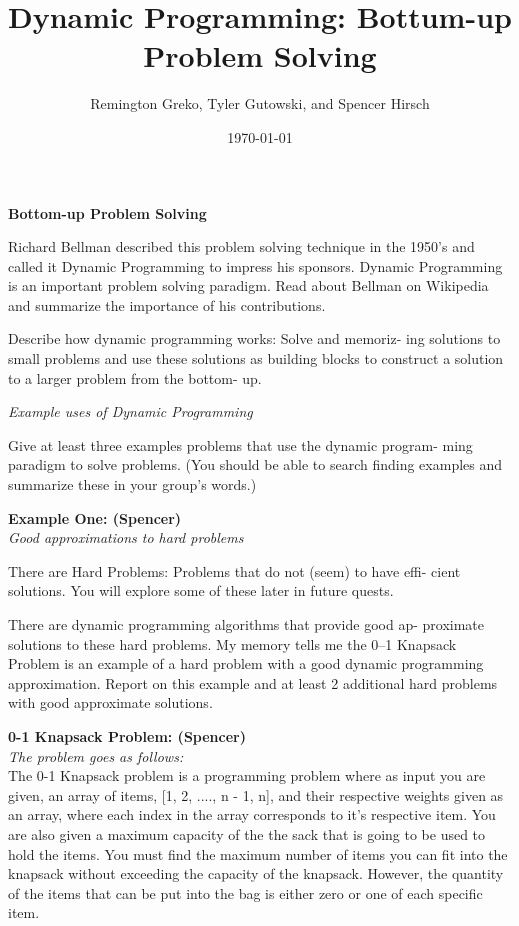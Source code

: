 \documentclass{article}
\begin{document}
\title{\textbf{Dynamic Programming: Bottum-up Problem Solving}}
\author{Remington Greko, Tyler Gutowski, and Spencer Hirsch}
\date{\today}

\maketitle

\noindent \textbf{Bottom-up Problem Solving} 


Richard Bellman described this problem solving technique in the
1950’s and called it Dynamic Programming to impress his sponsors.
Dynamic Programming is an important problem solving paradigm.
Read about Bellman on Wikipedia and summarize the importance
of his contributions.

\medskip

Describe how dynamic programming works: Solve and memoriz-
ing solutions to small problems and use these solutions as building
blocks to construct a solution to a larger problem from the bottom-
up.

\bigskip

\noindent \textit{Example uses of Dynamic Programming}


Give at least three examples problems that use the dynamic program-
ming paradigm to solve problems. (You should be able to search
finding examples and summarize these in your group’s words.)

\bigskip

\textbf{Example One: (Spencer)} \\


\noindent \textit{Good approximations to hard problems}

\medskip

There are Hard Problems: Problems that do not (seem) to have effi-
cient solutions. You will explore some of these later in future quests.

\medskip

There are dynamic programming algorithms that provide good ap-
proximate solutions to these hard problems. My memory tells me the
0–1 Knapsack Problem is an example of a hard problem with a good
dynamic programming approximation. Report on this example and
at least 2 additional hard problems with good approximate solutions.

\bigskip

\textbf{0-1 Knapsack Problem: (Spencer)} \\

\noindent \textit{The problem goes as follows:} \\
The 0-1 Knapsack problem is a programming problem where as input you
are given, an array of items, [1, 2, ...., n - 1, n], and their 
respective weights given as an array, where each index in the array
corresponds to it's respective item. You are also given a maximum capacity
of the the sack that is going to be used to hold the items. You must find
the maximum number of items you can fit into the knapsack without exceeding
the capacity of the knapsack. However, the quantity of the items that can
be put into the bag is either zero or one of each specific item.
\end{document}
